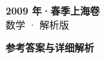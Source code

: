 \documentclass[zihao=-4, a4paper]{ctexart}
\begin{document}
\begin{center}
  {\Large\bfseries 2009 年·春季上海卷}\\[4pt]
  {\large 数学 · 解析版}
\end{center}
\medskip
{}

\clearpage
{}
\begin{center}{\Large\bfseries 参考答案与详细解析}\end{center}
\medskip

\end{document}
